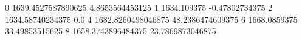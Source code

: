 0 1639.4527587890625 4.8653564453125
1 1634.109375 -0.47802734375
2 1634.58740234375 0.0
4 1682.8260498046875 48.2386474609375
6 1668.0859375 33.49853515625
8 1658.3743896484375 23.7869873046875
